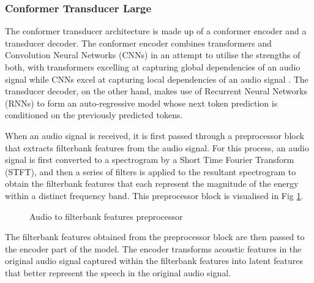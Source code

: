 \documentclass{CSSRforAfrica}
\newcounter{subsubsubsection}[subsubsection]
\begin{document}
\subsubsection{Conformer Transducer Large}
The conformer transducer architecture is made up of a conformer encoder and a transducer decoder. The conformer encoder combines transformers and Convolution Neural Networks (CNNs) in an attempt to utilise the strengths of both, with transformers excelling at capturing global dependencies of an audio signal while CNNs excel at capturing local dependencies of an audio signal \cite{gulati_conformer_2020}. The transducer decoder, on the other hand, makes use of Recurrent Neural Networks (RNNs) to form an auto-regressive model whose next token prediction is conditioned on the previously predicted tokens.

When an audio signal is received, it is first passed through a preprocessor block that extracts filterbank features from the audio signal. For this process, an audio signal is first converted to a spectrogram by a Short Time Fourier Transform (STFT), and then a series of filters is applied to the resultant spectrogram to obtain the filterbank features that each represent the magnitude of the energy within a distinct frequency band. This preprocessor block is visualised in Fig \ref{fig:preprocessor}.

\begin{figure}[thb]
\begin{center}
\end{center}
\caption{Audio to filterbank features preprocessor}
\label{fig:preprocessor}
\end{figure}

\newpage
{}
The filterbank features obtained from the preprocessor block are then passed to the encoder part of the model. The encoder transforms acoustic features in the original audio signal captured within the filterbank features into latent features that better represent the speech in the original audio signal.
\end{document}
